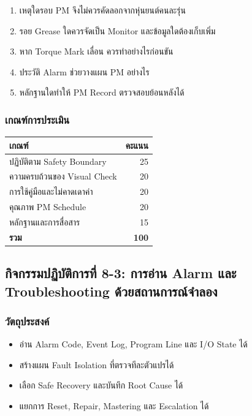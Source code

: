 \begin{enumerate}
    \item เหตุใดรอบ PM จึงไม่ควรคัดลอกจากหุ่นยนต์คนละรุ่น
    \item รอย Grease ใดควรจัดเป็น Monitor และข้อมูลใดต้องเก็บเพิ่ม
    \item หาก Torque Mark เลื่อน ควรทำอย่างไรก่อนขัน
    \item ประวัติ Alarm ช่วยวางแผน PM อย่างไร
    \item หลักฐานใดทำให้ PM Record ตรวจสอบย้อนหลังได้
\end{enumerate}

\subsubsection{เกณฑ์การประเมิน}

\begin{table}[htbp]
    \centering
    \begin{tabular}{l r}
        \hline
        \textbf{เกณฑ์} & \textbf{คะแนน} \\
        \hline
        ปฏิบัติตาม Safety Boundary & 25 \\
        ความครบถ้วนของ Visual Check & 20 \\
        การใช้คู่มือและไม่คาดเดาค่า & 20 \\
        คุณภาพ PM Schedule & 20 \\
        หลักฐานและการสื่อสาร & 15 \\
        \textbf{รวม} & \textbf{100} \\
        \hline
    \end{tabular}
\end{table}



\subsection{กิจกรรมปฏิบัติการที่ 8-3: การอ่าน Alarm และ Troubleshooting ด้วยสถานการณ์จำลอง}

\subsubsection{วัตถุประสงค์}

\begin{itemize}
    \item อ่าน Alarm Code, Event Log, Program Line และ I/O State ได้
    \item สร้างแผน Fault Isolation ที่ตรวจทีละตัวแปรได้
    \item เลือก Safe Recovery และบันทึก Root Cause ได้
    \item แยกการ Reset, Repair, Mastering และ Escalation ได้
\end{itemize}

